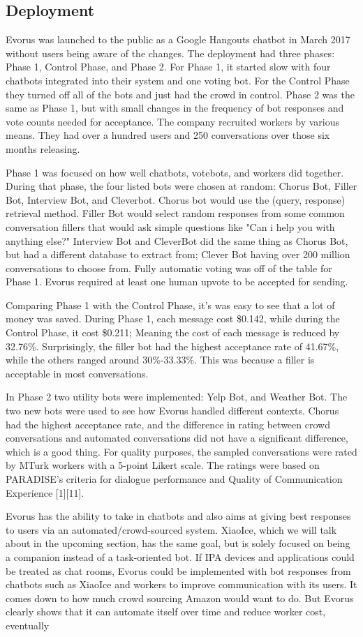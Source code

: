\documentclass[letterpaper, 10 pt, conference]{IEEEtran}
\begin{document}
\subsection{Deployment}
Evorus was launched to the public as a Google Hangouts chatbot in March 2017 without users being aware of the changes. The deployment had three phases: Phase 1, Control Phase, and Phase 2. For Phase 1, it started slow with four chatbots integrated into their system and one voting bot. For the Control Phase they turned off all of the bots and just had the crowd in control. Phase 2 was the same as Phase 1, but with small changes in the frequency of bot responses and vote counts needed for acceptance. The company recruited workers by various means. They had over a hundred users and 250 conversations over those six months releasing. \par Phase 1 was focused on how well chatbots, votebots, and workers did together. During that phase, the four listed bots were chosen at random: Chorus Bot, Filler Bot, Interview Bot, and Cleverbot. Chorus bot would use the (query, response) retrieval method. Filler Bot would select random responses from some common conversation fillers that would ask simple questions like "Can i help you with anything else?" Interview Bot and CleverBot did the same thing as Chorus Bot, but had a different database to extract from; Clever Bot having over 200 million conversations to choose from. Fully automatic voting was off of the table for Phase 1. Evorus required at least one human upvote to be accepted for sending. \par Comparing Phase 1 with the Control Phase, it's was easy to see that a lot of money was saved. During Phase 1, each message cost \$0.142, while during the Control Phase, it cost \$0.211; Meaning the cost of each message is reduced by 32.76\%. Surprisingly, the filler bot had the highest acceptance rate of 41.67\%, while the others ranged around 30\%-33.33\%. This was because a filler is acceptable in most conversations. \par In Phase 2 two utility bots were implemented: Yelp Bot, and Weather Bot. The two new bots were used to see how Evorus handled different contexts. Chorus had the highest acceptance rate, and the difference in rating between crowd conversations and automated conversations did not have a significant difference, which is a good thing. For quality purposes, the sampled conversations were rated by MTurk workers with a 5-point Likert scale. The ratings were based on PARADISE's criteria for dialogue performance and Quality of Communication Experience [1][11]. \par Evorus has the ability to take in chatbots and also aims at giving best responses to users via an automated/crowd-sourced system. XiaoIce, which we will talk about in the upcoming section, has the same goal, but is solely focused on being a companion instead of a task-oriented bot. If IPA devices and applications could be treated as chat rooms, Evorus could be implemented with bot responses from chatbots such as XiaoIce and workers to improve communication with its users. It comes down to how much crowd sourcing Amazon would want to do. But Evorus clearly shows that it can automate itself over time and reduce worker cost, eventually 
\end{document}
